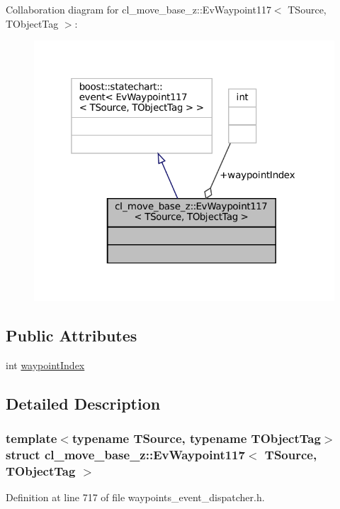 Collaboration diagram for cl\+\_\+move\+\_\+base\+\_\+z\+:\+:Ev\+Waypoint117$<$ T\+Source, T\+Object\+Tag $>$\+:
\nopagebreak
\begin{figure}[H]
\begin{center}
\leavevmode
\includegraphics[width=319pt]{structcl__move__base__z_1_1EvWaypoint117__coll__graph}
\end{center}
\end{figure}
\subsection*{Public Attributes}
\begin{DoxyCompactItemize}
\item 
int \hyperlink{structcl__move__base__z_1_1EvWaypoint117_aed213fa72d6a82c25d55c70bcc0dee37}{waypoint\+Index}
\end{DoxyCompactItemize}


\subsection{Detailed Description}
\subsubsection*{template$<$typename T\+Source, typename T\+Object\+Tag$>$\newline
struct cl\+\_\+move\+\_\+base\+\_\+z\+::\+Ev\+Waypoint117$<$ T\+Source, T\+Object\+Tag $>$}



Definition at line 717 of file waypoints\+\_\+event\+\_\+dispatcher.\+h.



